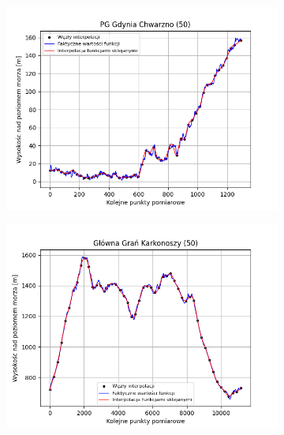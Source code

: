 \documentclass[fleqn]{article}
\begin{document}
    \begin{figure}[h]
        \centering
        \begin{subfigure}{.33\textwidth}
            \centering
            \includegraphics[width=\linewidth]{plot_50_points_PG_Gdynia_Chwarzno.png}
            \label{fig:sub1}
        \end{subfigure}
        \begin{subfigure}{.33\textwidth}
          \centering
          \includegraphics[width=\linewidth]{plot_50_points_Główna_Grań_Karkonoszy.png}
          \label{fig:sub2}
        \end{subfigure}%
        \begin{subfigure}{.33\textwidth}
          \centering

\end{subfigure}
\end{figure}
\end{document}
